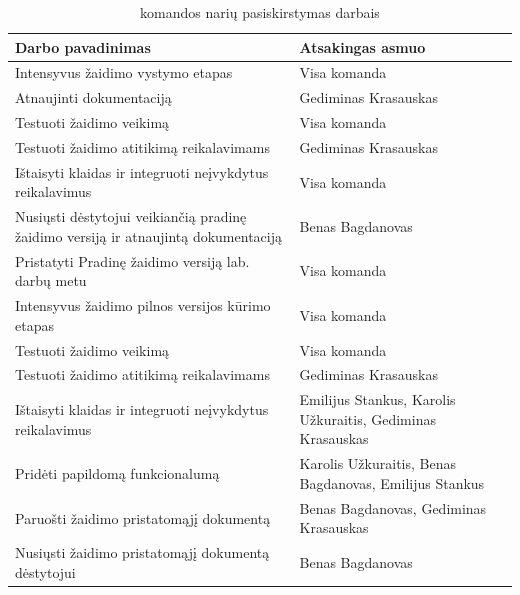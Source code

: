 \documentclass{VUMIFPSkursinis}
\begin{document}
{\centering
\begin{longtable}{|L{8,6cm}|L{6,1cm}|}
\caption{komandos narių pasiskirstymas darbais}
\label{variability_impl_mech}
\endfirsthead
\endhead
\hline

\textbf{Darbo pavadinimas} & 
\textbf{Atsakingas asmuo} \\ \hline

Intensyvus žaidimo vystymo etapas &
Visa komanda \\ \hline

Atnaujinti dokumentaciją &
Gediminas Krasauskas \\ \hline

Testuoti žaidimo veikimą &
Visa komanda \\ \hline

Testuoti žaidimo atitikimą reikalavimams &
Gediminas Krasauskas \\ \hline

Ištaisyti klaidas ir integruoti neįvykdytus reikalavimus &
Visa komanda \\ \hline

Nusiųsti dėstytojui veikiančią pradinę žaidimo versiją ir atnaujintą dokumentaciją &
Benas Bagdanovas \\ \hline

Pristatyti Pradinę žaidimo versiją lab. darbų metu &
Visa komanda \\ \hline

Intensyvus žaidimo pilnos versijos kūrimo etapas &
Visa komanda \\ \hline

Testuoti žaidimo veikimą &
Visa komanda \\ \hline

Testuoti žaidimo atitikimą reikalavimams &
Gediminas Krasauskas \\ \hline

Ištaisyti klaidas ir integruoti neįvykdytus reikalavimus &
Emilijus Stankus, Karolis Užkuraitis, Gediminas Krasauskas \\ \hline

Pridėti papildomą funkcionalumą &
Karolis Užkuraitis, Benas Bagdanovas, Emilijus Stankus \\ \hline

Paruošti žaidimo pristatomąjį dokumentą &
Benas Bagdanovas, Gediminas Krasauskas \\ \hline

Nusiųsti žaidimo pristatomąjį dokumentą dėstytojui &
Benas Bagdanovas \\ \hline


\end{longtable}}
\end{document}
